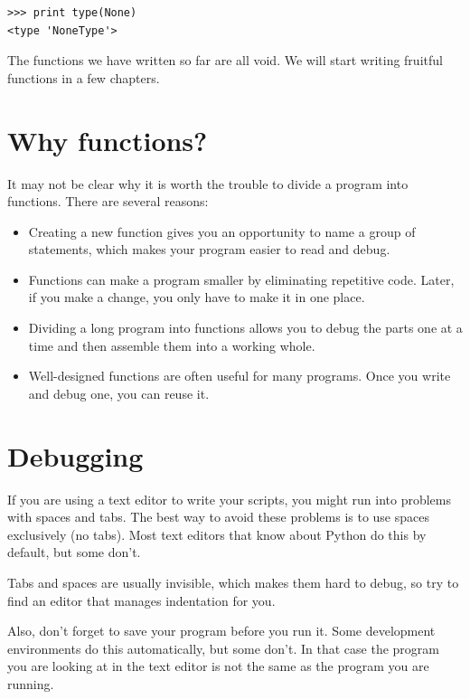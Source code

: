 \documentclass[10pt]{book}
\begin{document}
\beforeverb
\begin{verbatim}
>>> print type(None)
<type 'NoneType'>
\end{verbatim}
\afterverb
%
The functions we have written so far are all void.  We will start
writing fruitful functions in a few chapters.


\section{Why functions?}

It may not be clear why it is worth the trouble to divide
a program into functions.  There are several reasons:

\begin{itemize}

\item Creating a new function gives you an opportunity to name a group
of statements, which makes your program easier to read and debug.

\item Functions can make a program smaller by eliminating repetitive
code.  Later, if you make a change, you only have
to make it in one place.

\item Dividing a long program into functions allows you to debug the
parts one at a time and then assemble them into a working whole.

\item Well-designed functions are often useful for many programs.
Once you write and debug one, you can reuse it.

\end{itemize}


\section{Debugging}
\label{editor}

If you are using a text editor to write your scripts, you might
run into problems with spaces and tabs.  The best way to avoid
these problems is to use spaces exclusively (no tabs).  Most text
editors that know about Python do this by default, but some
don't.


Tabs and spaces are usually invisible, which makes them
hard to debug, so try to find an editor that manages indentation
for you.

Also, don't forget to save your program before you run it.  Some
development environments do this automatically, but some don't.
In that case the program you are looking at in the text editor
is not the same as the program you are running.
\end{document}
